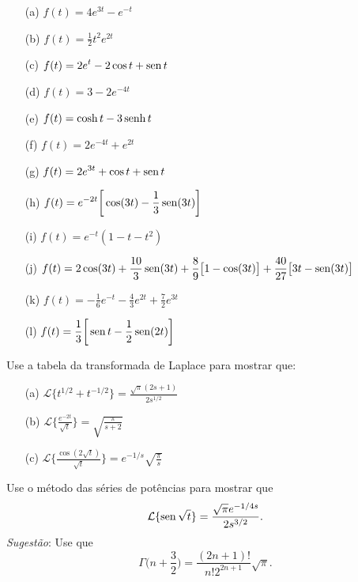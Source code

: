 \documentclass[Main.tex]{subfiles}
\begin{document}
\begin{Answer}
\begin{itemize}
  \item[(a)] $\displaystyle f(t) = 4e^{3t} - e^{-t}$
  \item[(b)] $\displaystyle f(t) = \frac{1}{2} t^2 e^{2t}$
  \item[(c)] $\displaystyle f(t) = 2e^{t} - 2 \cos t + \operatorname{sen} t$
  \item[(d)] $\displaystyle f(t) = 3 -2 e^{-4t}$
  \item[(e)] $\displaystyle f(t) = \cosh t - 3 \operatorname{senh} t$
  \item[(f)] $\displaystyle f(t) = 2e^{-4t} + e^{2t}$
  \item[(g)] $\displaystyle f(t) = 2e^{3t} + \cos t + \operatorname{sen} t$
  \item[(h)] $\displaystyle f(t) = e^{-2t}\bigg[ \cos(3t) - \frac{1}{3} \operatorname{sen} (3t) \bigg]$
  \item[(i)] $\displaystyle f(t) = e^{-t}(1-t-t^2)$
  \item[(j)] $\displaystyle f(t) = 2\cos(3t) +\frac{10}{3} \operatorname{sen}(3t) +\frac{8}{9} \big[1-\cos(3t)\big] + \frac{40}{27} \big[3t - \operatorname{sen}(3t)\big]$
  \item[(k)] $\displaystyle f(t) = -\frac{1}{6} e^{-t} -\frac{4}{3} e^{2t} + \frac{7}{2} e^{3t}$
  \item[(l)] $\displaystyle f(t) = \frac{1}{3} \bigg[ \operatorname{sen} t - \frac{1}{2}\operatorname{sen}(2t) \bigg]$
\end{itemize}
\end{Answer}


\begin{Exercise}
Use a tabela da transformada de Laplace para mostrar que:

\begin{itemize}
  \item[(a)] $\displaystyle \mathcal{L} \big\{ t^{1/2}+ t^{-1/2} \big\} = \frac{\sqrt{\pi}(2s+1)}{2s^{1/2}}$
  \item[(b)] $\displaystyle \mathcal{L} \bigg\{ \frac{e^{-2t}}{\sqrt{t}} \bigg\} = \sqrt{\frac{\pi}{s+2}}$
  \item[(c)] $\displaystyle \mathcal{L} \bigg\{ \frac{\cos(2\sqrt{t}) }{\sqrt{t}} \bigg\} = e^{-1/s}\sqrt{\frac{\pi}{s}}$
\end{itemize}
\end{Exercise}


\begin{Exercise}
Use o método das séries de potências para mostrar que \[\mathcal{L} \{\operatorname{sen} \sqrt{t} \} =  \frac{\sqrt{\pi} e^{-1/4s}}{2s^{3/2}}.\]
\emph{Sugestão}: Use que \[\Gamma\bigg( n + \frac{3}{2} \bigg) = \frac{ (2n+1)!}{ n! 2^{2n+1}}\sqrt{\pi}.\]
\end{Exercise}
\end{document}
